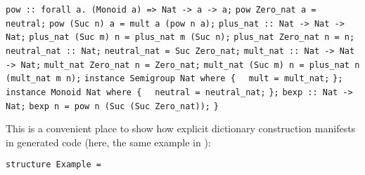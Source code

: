 \begin{isabellebody}
\begin{isamarkuptext}
\verb|pow :: forall a. (Monoid a) => Nat -> a -> a;|\newline%
\verb|pow Zero_nat a = neutral;|\newline%
\verb|pow (Suc n) a = mult a (pow n a);|\newline%
\newline%
\verb|plus_nat :: Nat -> Nat -> Nat;|\newline%
\verb|plus_nat (Suc m) n = plus_nat m (Suc n);|\newline%
\verb|plus_nat Zero_nat n = n;|\newline%
\newline%
\verb|neutral_nat :: Nat;|\newline%
\verb|neutral_nat = Suc Zero_nat;|\newline%
\newline%
\verb|mult_nat :: Nat -> Nat -> Nat;|\newline%
\verb|mult_nat Zero_nat n = Zero_nat;|\newline%
\verb|mult_nat (Suc m) n = plus_nat n (mult_nat m n);|\newline%
\newline%
\verb|instance Semigroup Nat where {|\newline%
\verb|  mult = mult_nat;|\newline%
\verb|};|\newline%
\newline%
\verb|instance Monoid Nat where {|\newline%
\verb|  neutral = neutral_nat;|\newline%
\verb|};|\newline%
\newline%
\verb|bexp :: Nat -> Nat;|\newline%
\verb|bexp n = pow n (Suc (Suc Zero_nat));|\newline%
\newline%
\verb|}|%
\end{isamarkuptext}%
\isamarkuptrue%
%
\endisatagquote
{\isafoldquote}%
%
\isadelimquote
%
\endisadelimquote
%
\begin{isamarkuptext}%
\noindent This is a convenient place to show how explicit dictionary construction
  manifests in generated code (here, the same example in ):%
\end{isamarkuptext}%
\isamarkuptrue%
%
\isadelimquote
%
\endisadelimquote
%
\isatagquote
%
\begin{isamarkuptext}%
\isaverbatim%
\noindent%
\verb|structure Example = |\newline%

\end{isamarkuptext}
\end{isabellebody}
